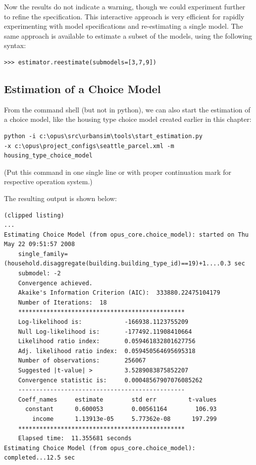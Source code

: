 Now the results do not indicate a warning, though we could
experiment further to refine the specification. This
interactive approach is very efficient for rapidly
experimenting with model specifications and re-estimating a
single model.  The same approach is available to estimate a
subset of the models, using the following syntax:

\begin{verbatim}
>>> estimator.reestimate(submodels=[3,7,9])
\end{verbatim}

\subsection{Estimation of a Choice Model}

From the command shell (but not in python), we can also
start the estimation of a choice model, like the housing
type choice model created earlier in this chapter:

\begin{verbatim}
python -i c:\opus\src\urbansim\tools\start_estimation.py 
-x c:\opus\project_configs\seattle_parcel.xml -m housing_type_choice_model 
\end{verbatim}
(Put this command in one single line or with proper continuation
mark for respective operation system.)

The resulting output is shown below:

\begin{verbatim}
(clipped listing)
...
Estimating Choice Model (from opus_core.choice_model): started on Thu May 22 09:51:57 2008
    single_family=(household.disaggregate(building.building_type_id)==19)+1....0.3 sec
    submodel: -2
    Convergence achieved.
    Akaike's Information Criterion (AIC):  333880.22475104179
    Number of Iterations:  18
    ***********************************************
    Log-likelihood is:            -166938.1123755209
    Null Log-likelihood is:       -177492.11908410664
    Likelihood ratio index:       0.059461832801627756
    Adj. likelihood ratio index:  0.059450564695695318
    Number of observations:       256067
    Suggested |t-value| >         3.5289083875852207
    Convergence statistic is:     0.00048567907076085262
    -----------------------------------------------
    Coeff_names     estimate        std err         t-values
      constant      0.600053        0.00561164        106.93
        income      1.13913e-05     5.77362e-08      197.299
    ***********************************************
    Elapsed time:  11.355681 seconds
Estimating Choice Model (from opus_core.choice_model): completed...12.5 sec
\end{verbatim}

